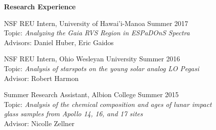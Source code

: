 \documentclass{resume} %
\begin{document}

\vspace{-0.1in}
\begin{rSection}{\textbf{Research Experience}}
\vspace{0.02in}

{NSF REU Intern, {University of Hawai'i-Manoa}} \hfill {Summer 2017}
\vspace{0.04in}
\\
{Topic:} \emph{Analyzing the Gaia RVS Region in ESPaDOnS Spectra}
\vspace{0.04in}
\\
{Advisors:} Daniel Huber, Eric Gaidos
\vspace{0.05in}

{NSF REU Intern, Ohio Wesleyan University} \hfill {Summer 2016}
\vspace{0.04in}
\\
{ Topic:} \emph{Analysis of starspots on the young solar analog LO Pegasi}
\vspace{0.04in}
\\
{ Advisor:} Robert Harmon
\vspace{0.05in}

{ Summer Research Assistant, Albion College} \hfill {Summer 2015}
\vspace{0.04in}
\\
{ Topic:} \emph{Analysis of the chemical composition and ages of lunar impact \\ glass samples from Apollo 14, 16, and 17 sites}
\vspace{0.04in}
\\
{ Advisor:}  Nicolle Zellner
\vspace{0.05in}
\end{rSection}


\end{document}
